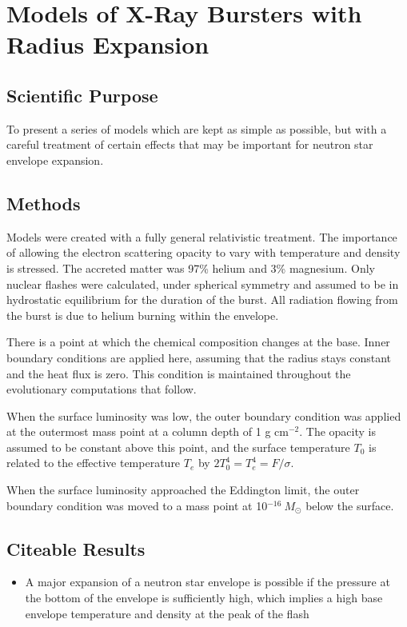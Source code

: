 \documentclass[onecolumn]{aastex63}
\begin{document}
\section{Models of X-Ray Bursters with Radius Expansion}

\begin{centering}

\cite{paczynski1983}

\end{centering} 


\subsection{Scientific Purpose}
To present a series of models which are kept as simple as possible, but with a careful treatment of certain effects that may be important for neutron star envelope expansion.
\subsection{Methods}
Models were created with a fully general relativistic treatment. The importance of allowing the electron scattering opacity to vary with temperature and density is stressed. The accreted matter was 97\% helium and 3\% magnesium. Only nuclear flashes were calculated, under spherical symmetry and assumed to be in hydrostatic equilibrium for the duration of the burst. All radiation flowing from the burst is due to helium burning within the envelope.

There is a point at which the chemical composition changes at the base. Inner boundary conditions are applied here, assuming that the radius stays constant and the heat flux is zero. This condition is maintained throughout the evolutionary computations that follow. 

When the surface luminosity was low, the outer boundary condition was applied at the outermost mass point at a column depth of 1 g cm$^{-2}$. The opacity is assumed to be constant above this point, and the surface temperature $T_0$ is related to the effective temperature $T_e$ by $2T_0^4 = T_e^4 = F/\sigma$. 

When the surface luminosity approached the Eddington limit, the outer boundary condition was moved to a mass point at 10$^{-16}\ M_\odot$ below the surface. 

\subsection{Citeable Results}
\begin{itemize}
    \item A major expansion of a neutron star envelope is possible if the pressure at the bottom of the envelope is sufficiently high, which implies a high base envelope temperature and density at the peak of the flash
\end{itemize}
\end{document}
